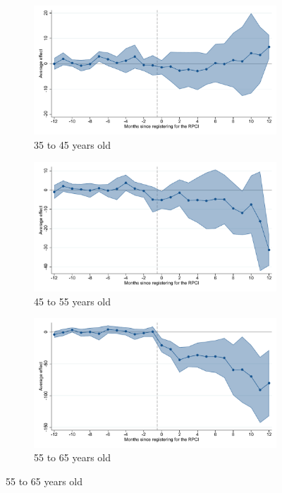 \begin{figure}[H]
    \begin{subfigure}{0.32\textwidth}
    \caption{35 to 45 years old}
    \includegraphics[width=\textwidth]{04_Figures/muestra_10porciento/event_study_sal_formal_age_35_45_dcdh_connected.pdf}
    \end{subfigure}
    \begin{subfigure}{0.32\textwidth}
    \caption{45 to 55 years old}
    \includegraphics[width=\textwidth]{04_Figures/muestra_10porciento/event_study_sal_formal_age_45_55_dcdh_connected.pdf}
    \end{subfigure}
    \begin{subfigure}{0.32\textwidth}
    \caption{55 to 65 years old}
    \includegraphics[width=\textwidth]{04_Figures/muestra_10porciento/event_study_sal_formal_age_55_65_dcdh_connected.pdf}
    \end{subfigure}


\end{figure}

